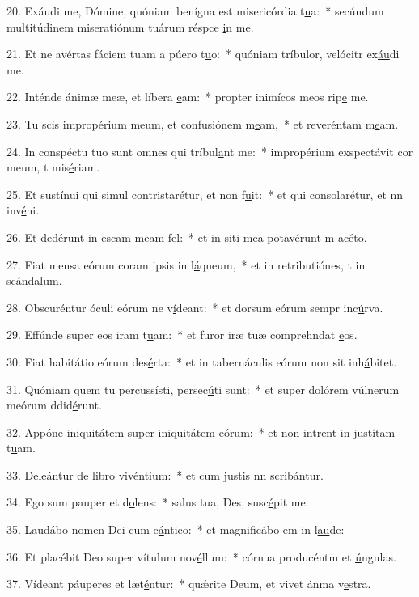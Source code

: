 20. Exáudi me, Dómine, quóniam benígna est misericórdia t\uline{u}a:~* secúndum multitúdinem miseratiónum tuárum réspce \uline{i}n me.\par 
21. Et ne avértas fáciem tuam a púero t\uline{u}o:~* quóniam tríbulor, velócitr ex\uline{áu}di me.\par 
22. Inténde ánimæ meæ, et líbera \uline{e}am:~* propter inimícos meos rip\uline{e} me.\par 
23. Tu scis impropérium meum, et confusiónem m\uline{e}am,~* et reveréntam m\uline{e}am.\par 
24. In conspéctu tuo sunt omnes qui tríbul\uline{a}nt me:~* impropérium exspectávit cor meum, t mis\uline{é}riam.\par 
25. Et sustínui qui simul contristarétur, et non f\uline{u}it:~* et qui consolarétur, et nn inv\uline{é}ni.\par 
26. Et dedérunt in escam m\uline{e}am fel:~* et in siti mea potavérunt m ac\uline{é}to.\par 
27. Fiat mensa eórum coram ipsis in l\uline{á}queum,~* et in retributiónes, t in sc\uline{á}ndalum.\par 
28. Obscuréntur óculi eórum ne v\uline{í}deant:~* et dorsum eórum sempr inc\uline{ú}rva.\par 
29. Effúnde super eos iram t\uline{u}am:~* et furor iræ tuæ comprehndat \uline{e}os.\par 
30. Fiat habitátio eórum des\uline{é}rta:~* et in tabernáculis eórum non sit  inh\uline{á}bitet.\par 
31. Quóniam quem tu percussísti, persec\uline{ú}ti sunt:~* et super dolórem vúlnerum meórum ddid\uline{é}runt.\par 
32. Appóne iniquitátem super iniquitátem e\uline{ó}rum:~* et non intrent in justítam t\uline{u}am.\par 
33. Deleántur de libro viv\uline{é}ntium:~* et cum justis nn scrib\uline{á}ntur.\par 
34. Ego sum pauper et d\uline{o}lens:~* salus tua, Des, susc\uline{é}pit me.\par 
35. Laudábo nomen Dei cum c\uline{á}ntico:~* et magnificábo em in l\uline{au}de:\par 
36. Et placébit Deo super vítulum nov\uline{é}llum:~* córnua producéntm et \uline{ú}ngulas.\par 
37. Vídeant páuperes et læt\uline{é}ntur:~* quǽrite Deum, et vivet ánma v\uline{e}stra.\par 
